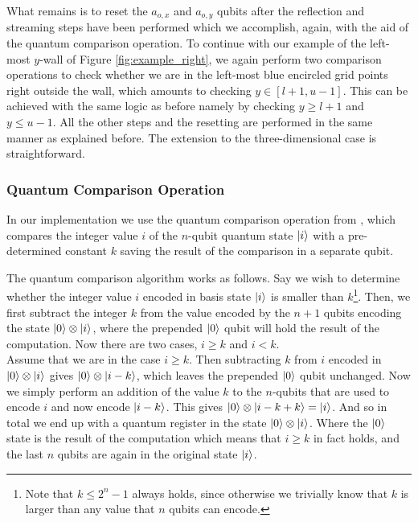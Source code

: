 What remains is to reset the $a_{o,x}$ and $a_{o,y}$ qubits after the reflection and streaming steps have been performed which we accomplish, again, with the aid of the quantum comparison operation. To continue with our example of the left-most $y$-wall of Figure \ref{fig:example_right}, we again perform two comparison operations to check whether we are in the left-most blue encircled grid points right outside the wall, which amounts to checking $y \in [l+1,u-1]$. This can be achieved with the same logic as before namely by checking $y \geq l+1$ and $y \leq u-1$. All the other steps and the resetting are performed in the same manner as explained before. The extension to the three-dimensional case is straightforward.






\subsubsection{Quantum Comparison Operation}\label{ssec: quantum comparison}
In our implementation we use the quantum comparison operation from \cite{Gidney2017}, which compares the integer value $i$ of the $n$-qubit quantum state $\ket{i}$ with a pre-determined constant $k$ saving the result of the comparison in a separate qubit. 


The quantum comparison algorithm works as follows. Say we wish to determine whether the integer value $i$ encoded in basis state $\ket{i}$ is smaller than $k$\footnote{Note that $k \leq 2^n-1$ always holds, since otherwise we trivially know that $k$ is larger than any value that $n$ qubits can encode.}. Then, we first subtract the integer $k$ from the value encoded by the $n+1$ qubits encoding the state $\ket{0}\otimes\ket{i}$, where the prepended $\ket{0}$ qubit will hold the result of the computation. Now there are two cases, $i\geq k$ and $i<k$. \\

Assume that we are in the case $i \geq k$. Then subtracting $k$ from $i$ encoded in  $\ket{0}\otimes\ket{i}$ gives $\ket{0}\otimes \ket{i-k}$, which leaves the prepended $\ket{0}$ qubit unchanged. 
Now we simply perform an addition of the value $k$ to the $n$-qubits that are used to encode $i$ and now encode $\ket{i-k}$. This gives $\ket{0}\otimes\ket{i-k+k} = \ket{i}$. And so in total we end up with a quantum register in the state $\ket{0}\otimes\ket{i}$. Where the $\ket{0}$ state is the result of the computation which means that $i \geq k$ in fact holds, and the last $n$ qubits are again in the original state $\ket{i}$. \\


